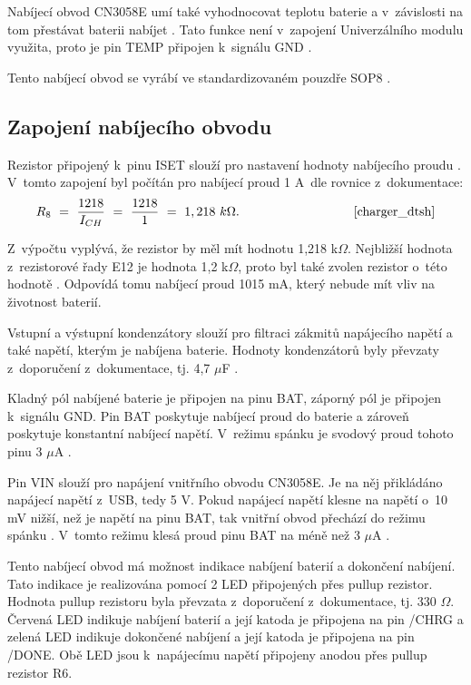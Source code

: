 Nabíjecí obvod CN3058E umí také vyhodnocovat teplotu baterie a v~závislosti na tom přestávat baterii nabíjet \cite{charger_dtsh}. Tato funkce není v~zapojení
Univerzálního modulu využita, proto je pin TEMP připojen k~signálu GND \cite{charger_dtsh}.

Tento nabíjecí obvod se vyrábí ve standardizovaném pouzdře SOP8 \cite{charger_dtsh}.

\subsection{Zapojení nabíjecího obvodu}
Rezistor připojený k~pinu ISET slouží pro nastavení hodnoty nabíjecího proudu \cite{charger_dtsh}. V~tomto zapojení byl počítán pro nabíjecí proud 1 A~dle rovnice
z~dokumentace: 
\begin{equation} 
  R_{8}~=~\frac{1218}{I_{CH}}~=~\frac{1218}{1}~=~1,218~k\Omega. 
  \quad \quad \quad \quad \quad \quad \quad \quad \quad \cite{charger_dtsh}
\label{eq:I_CH}
\end{equation}

Z~výpočtu vyplývá, že rezistor by měl mít hodnotu 1,218 k$\Omega$. Nejbližší hodnota z~rezistorové řady E12 je hodnota 1,2 k$\Omega$, proto byl také zvolen rezistor 
o~této hodnotě \cite{rezistorova_rada}. Odpovídá tomu nabíjecí proud 1015 mA, který nebude mít vliv na životnost baterií. 

Vstupní a výstupní kondenzátory slouží pro filtraci zákmitů napájecího napětí a také napětí, kterým je nabíjena baterie. Hodnoty kondenzátorů byly převzaty
z~doporučení z~dokumentace, tj. 4,7 $\mu$F \cite{charger_dtsh}.

Kladný pól nabíjené baterie je připojen na pinu BAT, záporný pól je připojen k~signálu GND. Pin BAT poskytuje nabíjecí proud do baterie a zároveň poskytuje konstantní 
nabíjecí napětí. V~režimu spánku je svodový proud tohoto pinu 3 $\mu$A \cite{charger_dtsh}. 

Pin VIN slouží pro napájení vnitřního obvodu CN3058E. Je na něj přikládáno napájecí napětí z~USB, tedy 5 V. Pokud napájecí napětí klesne na napětí o~10 mV nižší, 
než je napětí na pinu BAT, tak vnitřní obvod přechází do režimu spánku \cite{charger_dtsh}. V~tomto režimu klesá proud pinu BAT na méně než 3 $\mu$A \cite{charger_dtsh}.

Tento nabíjecí obvod má možnost indikace nabíjení baterií a dokončení nabíjení. Tato indikace je realizována pomocí 2 LED připojených přes pullup rezistor. Hodnota
pullup rezistoru byla převzata z~doporučení z~dokumentace, tj. 330 $\Omega$. Červená LED indikuje nabíjení baterií a její katoda je připojena na pin /CHRG a zelená LED
indikuje dokončené nabíjení a její katoda je připojena na pin /DONE. Obě LED jsou k~napájecímu napětí připojeny anodou přes pullup rezistor R6. 

